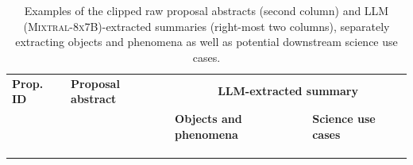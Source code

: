 \documentclass[10pt]{article} %
\newcommand{\SM}[1]{\textcolor{blue}{[SM: #1]}}
\begin{document}


\begin{landscape}
      \begin{table}[h!]
        \renewcommand{\arraystretch}{2}
          \centering
          \begin{tabular}{m{1.8cm} m{8cm} m{5cm} m{6.5cm}}
              \toprule
              \bfseries Prop. ID & \centering\arraybackslash \bfseries Proposal abstract & \multicolumn{2}{c}{\bfseries LLM-extracted summary} \tabularnewline
              \cmidrule(r){3-4}
              & & \centering\arraybackslash \bfseries Objects and phenomena & \centering\arraybackslash \bfseries Science use cases \tabularnewline
              \midrule
               & {\scriptsize } & {\scriptsize } & {\scriptsize } \tabularnewline
              \midrule
               & {\scriptsize } & {\scriptsize } & {\scriptsize } \tabularnewline
              \midrule
               & {\scriptsize } & {\scriptsize } & {\scriptsize } \tabularnewline
              \bottomrule
          \end{tabular}
          \caption{Examples of the clipped raw proposal abstracts (second column) and LLM (\textsc{Mixtral-8x7B})-extracted summaries (right-most two columns), separately extracting objects and phenomena as well as potential downstream science use cases.}
          \label{tab:datasetsumm}
      \end{table}
  \end{landscape}
\end{document}
